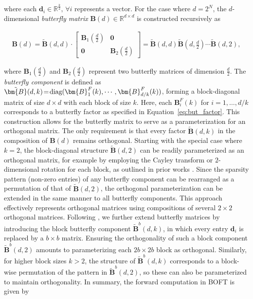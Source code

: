 where each $\bm{d}_i \in \mathbb{R}^{\frac{k}{2}},\,\forall i$ represents a vector. For the case where $d=2^N$, the $d$-dimensional \emph{butterfly matrix} $\bm{B}(d) \in \mathbb{R}^{d\times d}$ is constructed recursively as

\begin{equation}
\begin{aligned}
    \!\!\bm{B}(d)=\tilde{\bm{B}}(d,d)\!\cdot\!\begin{bmatrix}
    \bm{B}_1(\frac{d}{2})\!\!\!\!\! & \bm{0} \\
    \bm{0}\!\!\!\!\! &\bm{B}_2(\frac{d}{2})
    \end{bmatrix}= \tilde{\bm{B}}(d,d)\tilde{\bm{B}}(d,\frac{d}{2})\cdots\tilde{\bm{B}}(d,2),
\end{aligned}
\end{equation}

where $\bm{B}_1(\frac{d}{2})$ and $\bm{B}_2(\frac{d}{2})$ represent two butterfly matrices of dimension $\frac{d}{2}$. The \emph{butterfly component} is defined as $\thickmuskip=2mu \medmuskip=2mu \tilde{\bm{B}}(d,k)=\text{diag}(\bm{B}^F_1(k),\cdots,\bm{B}^F_{d/k}(k))$, forming a block-diagonal matrix of size $d\times d$ with each block of size $k$. Here, each $\bm{B}^F_i(k)$ for $i=1,\dots,d/k$ corresponds to a butterfly factor as specified in Equation~\ref{eq:but_factor}. This construction allows for the butterfly matrix to serve as a parameterization for an orthogonal matrix. The only requirement is that every factor $\tilde{\bm{B}}(d,k)$ in the composition of $\bm{B}(d)$ remains orthogonal. Starting with the special case where $k=2$, the block-diagonal structure $\tilde{\bm{B}}(d,2)$ can be readily parameterized as an orthogonal matrix, for example by employing the Cayley transform or $2$-dimensional rotation for each block, as outlined in prior works \cite{liu2021orthogonal,qiu2023controlling}. Since the sparsity pattern (non-zero entries) of any butterfly component can be rearranged as a permutation of that of $\tilde{\bm{B}}(d,2)$, the orthogonal parameterization can be extended in the same manner to all butterfly components. This approach effectively represents orthogonal matrices using compositions of several $2\times 2$ orthogonal matrices. Following \cite{chen2022pixelated}, we further extend butterfly matrices by introducing the block butterfly component $\tilde{\bm{B}}^b(d,k)$, in which every entry $\bm{d}_i$ is replaced by a $b\times b$ matrix. Ensuring the orthogonality of such a block component $\tilde{\bm{B}}^b(d,2)$ amounts to parameterizing each $2b\times 2b$ block as orthogonal. Similarly, for higher block sizes $k>2$, the structure of $\tilde{\bm{B}}^b(d,k)$ corresponds to a block-wise permutation of the pattern in $\tilde{\bm{B}}^b(d,2)$, so these can also be parameterized to maintain orthogonality. In summary, the forward computation in BOFT is given by

